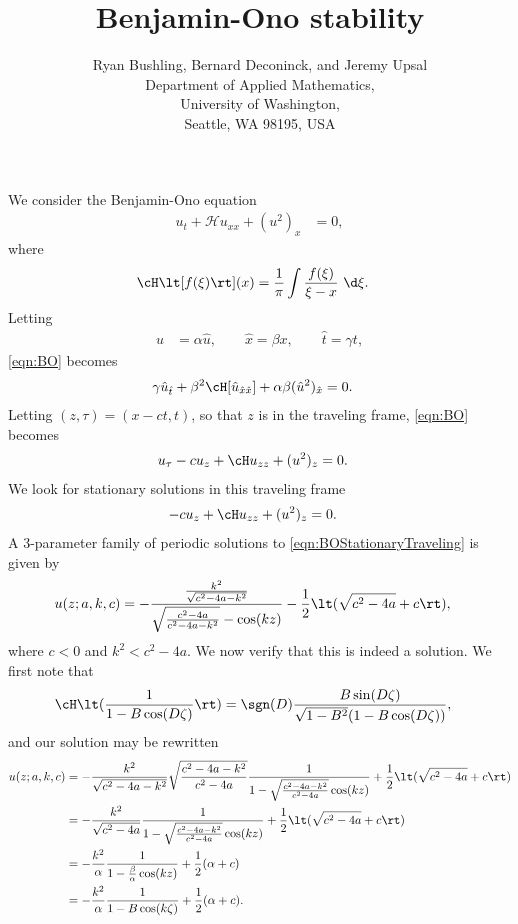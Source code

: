 \documentclass[a4paper,10pt]{article}
\title{Benjamin-Ono stability}
\author{Ryan Bushling, Bernard Deconinck, and Jeremy Upsal
  \\
Department of Applied Mathematics,\\
University of Washington,\\
Seattle, WA 98195, USA}
\begin{document}
\maketitle

We consider the Benjamin-Ono equation
\begin{align}
  u_t + \mathcal{H}u_{xx} + (u^2)_x &=0,\label{eqn:BO}
\end{align}
where
\begin{align}
  \cH \lt[f(\xi)\rt](x) &= \frac1\pi \int \frac{f(\xi)}{\xi - x}~\d \xi.
\end{align}
Letting 
\begin{align}
  u &= \alpha \hat u, \qquad \hat x = \beta x, \qquad \hat t = \gamma t,
\end{align}
\eqref{eqn:BO} becomes
\begin{align}
  \gamma \hat u_{\hat t} + \beta^2 \cH [\hat u_{\hat x \hat x}] + \alpha \beta
  (\hat u^2)_{\hat x} &= 0.
\end{align}
Letting $(z,\tau) = (x-ct, t)$, so that $z$ is in the traveling frame,
\eqref{eqn:BO} becomes
\begin{align}
  u_\tau - cu_z + \cH u_{zz} + (u^2)_z &=0.
\end{align}
We look for stationary solutions in this traveling frame
\begin{align}
  -c u_z + \cH u_{zz} + (u^2)_z &=0. \label{eqn:BOStationaryTraveling}
\end{align}
A 3-parameter family of periodic solutions to \eqref{eqn:BOStationaryTraveling}
is \cite{bronski2016modulational} given by
\begin{align}
  u(z; a, k, c) &=
  -\frac{\frac{k^2}{\sqrt{c^2-4a-k^2}}}{\sqrt{\frac{c^2-4a}{c^2-4a-k^2}} -
  \cos(kz)} - \frac12 \lt(\sqrt{c^2-4a}+c\rt),
\end{align}
where $c<0$ and $k^2<c^2-4a$.  We now verify that this is indeed a solution. We
first note that \cite{ono1975}
\begin{align}
	\cH \lt(\frac{1}{1-B\cos(D\zeta)}\rt) &= \sgn(D) \frac{B
	\sin(D\zeta)}{\sqrt{1-B^2}(1-B\cos(D\zeta))},
\end{align}
and our solution may be rewritten
\begin{align}
   u(z;a,k,c) &= -\frac{k^2}{\sqrt{c^2-4a-k^2}} \sqrt{\frac{c^2-4a-k^2}{c^2-4a}}
   \frac{1}{ 1 - \sqrt{\frac{c^2-4a-k^2}{c^2-4a}}\cos(kz)} + \frac12
   \lt(\sqrt{c^2-4a}+c\rt)\\
   &= -\frac{k^2}{\sqrt{c^2-4a}}
   \frac{1}{ 1 - \sqrt{\frac{c^2-4a-k^2}{c^2-4a}}\cos(kz)} + \frac12
   \lt(\sqrt{c^2-4a}+c\rt)\\
   &= -\frac{k^2}{\alpha}\frac{1}{1-\frac{\beta}{\alpha}\cos(kz)} + \frac12(\alpha + c)\\
   &= -\frac{k^2}{\alpha}\frac{1}{1-B \cos (k\zeta)} + \frac12( \alpha + c).
   \label{eqn:soln}
\end{align}
\end{document}
